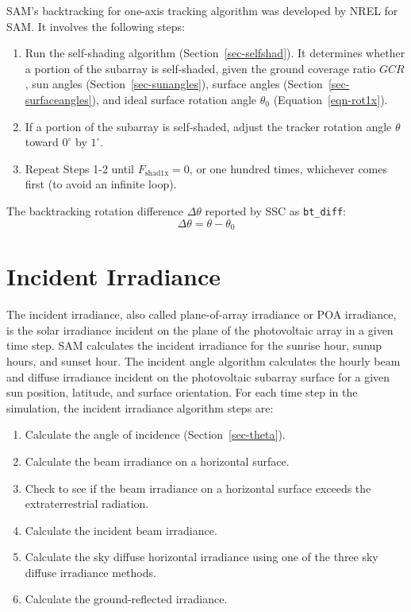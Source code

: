 \documentclass[12pt,letterpaper]{article}
\newcommand\GCR{\ensuremath{\mathit{GCR}}}
\begin{document}
SAM's backtracking for one-axis tracking algorithm was developed by NREL for SAM. It involves the following steps:
\begin{enumerate}
\item Run the self-shading algorithm (Section~\ref{sec-selfshad}). It determines whether a portion of the subarray is self-shaded, given the ground coverage ratio $\GCR$, sun angles (Section~\ref{sec-sunangles}), surface angles (Section~\ref{sec-surfaceangles}), and ideal surface rotation angle $\theta_0$ (Equation~\ref{eqn-rot1x}).
\item If a portion of the subarray is self-shaded, adjust the tracker rotation angle $\theta$ toward $0^\circ$ by $1^\circ$.
\item Repeat Steps 1-2 until $F_{\mathrm{shad1x}}=0$, or one hundred times, whichever comes first (to avoid an infinite loop).
\end{enumerate}

The backtracking rotation difference $\Delta\theta$ reported by SSC as \texttt{bt\_diff}:
\begin{equation}
\Delta\theta = \theta - \theta_0
\end{equation}

\chapter{Incident Irradiance}\label{sec-incidentirradiance}

The incident irradiance, also called plane-of-array irradiance or POA irradiance, is the solar irradiance incident on the plane of the photovoltaic array in a given time step. SAM calculates the incident irradiance for the sunrise hour, sunup hours, and sunset hour. The incident angle algorithm calculates the hourly beam and diffuse irradiance incident on the photovoltaic subarray surface for a given sun position, latitude, and surface orientation. For each  time step in the simulation, the incident irradiance algorithm steps are:

\begin{enumerate}
\item Calculate the angle of incidence (Section~\ref{sec-theta}).
\item Calculate the beam irradiance on a horizontal surface.
\item Check to see if the beam irradiance on a horizontal surface exceeds the extraterrestrial radiation.
\item Calculate the incident beam irradiance.
\item Calculate the sky diffuse horizontal irradiance using one of the three sky diffuse irradiance methods.
\item Calculate the ground-reflected irradiance.
\end{enumerate}
\end{document}
